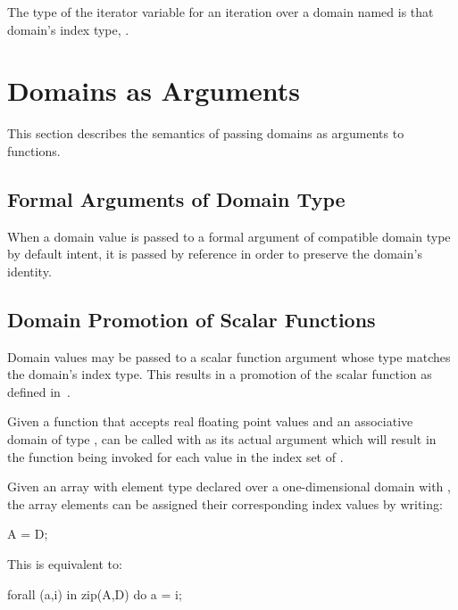 The type of the iterator variable for an iteration over a
domain named  is that domain's index type, .


\section{Domains as Arguments}
\label{Domain_Arguments}

This section describes the semantics of passing domains as arguments
to functions.

\subsection{Formal Arguments of Domain Type}

When a domain value is passed to a formal argument of compatible
domain type by default intent, it is passed by reference in order to
preserve the domain's identity.

\subsection{Domain Promotion of Scalar Functions}
\label{Domain_Promotion_of_Scalar_Functions}

Domain values may be passed to a scalar function argument whose type
matches the domain's index type.  This results in a promotion of the
scalar function as defined in~.

\begin{example}
Given a function  that accepts real floating point values
and an associative domain  of
type ,  can be called with  as
its actual argument which will result in the function being invoked
for each value in the index set of .
\end{example}

\begin{example}
Given an array  with element type  declared over a
one-dimensional domain  with  , the
array elements can be assigned their corresponding index values by
writing:
\begin{chapel}
A = D;
\end{chapel}
This is equivalent to:
\begin{chapel}
forall (a,i) in zip(A,D) do
  a = i;
\end{chapel}
\end{example}


